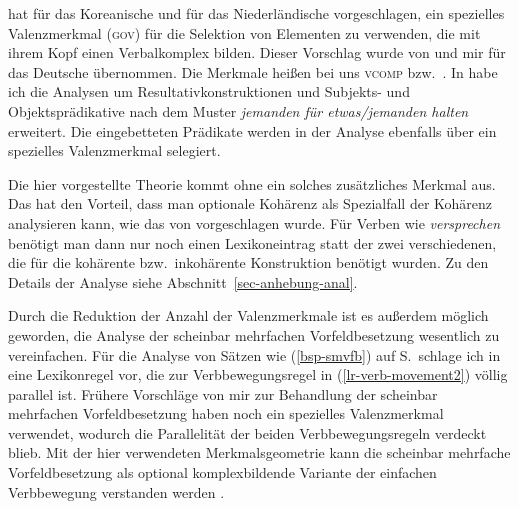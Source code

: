 \citet*{Chung93a} hat für das Koreanische
und \citet*{Rentier94} für das Niederländische vorgeschlagen,
ein spezielles Valenzmerkmal (\textsc{gov}) für die Selektion von Elementen zu verwenden,
die mit ihrem Kopf einen Verbalkomplex bilden. Dieser Vorschlag wurde
von \citet{Kathol98b,Kathol2000a} und mir \citep{Mueller97c,Mueller99a} für das Deutsche übernommen.
Die Merkmale heißen bei uns \textsc{vcomp} bzw.\ \xcomp.
In  habe ich die Analysen um Resultativkonstruktionen und Subjekts- und
Objektsprädikative nach dem Muster \emph{jemanden für etwas/jemanden halten} erweitert.
Die eingebetteten Prädikate werden in der Analyse ebenfalls über ein spezielles Valenzmerkmal selegiert.

Die hier vorgestellte Theorie kommt ohne ein solches zusätzliches Merkmal aus.
Das hat den Vorteil, dass man optionale Kohärenz als Spezialfall der Kohärenz analysieren
kann, wie das von \citet[178]{Kiss95a} vorgeschlagen wurde. Für Verben wie \emph{versprechen}
benötigt man dann nur noch einen Lexikoneintrag statt der zwei verschiedenen, die für
die kohärente bzw.\ inkohärente Konstruktion benötigt wurden. Zu den Details der Analyse siehe
Abschnitt~\ref{sec-anhebung-anal}.

Durch die Reduktion der Anzahl der Valenzmerkmale ist es außerdem möglich geworden,
die Analyse der scheinbar mehrfachen Vorfeldbesetzung wesentlich zu vereinfachen.
Für die Analyse von Sätzen wie (\ref{bsp-smvfb}) auf S.\,\pageref{bsp-smvfb} schlage ich in
\textcites{Mueller2005d}[Abschnitt~3.2.1]{MuellerGS}
eine Lexikonregel vor, die zur Verbbewegungsregel in (\ref{lr-verb-movement2})
völlig parallel ist. Frühere Vorschläge von mir zur Behandlung der 
scheinbar mehrfachen Vorfeldbesetzung \citep{Mueller2002f,Mueller2002c} haben
noch ein spezielles Valenzmerkmal verwendet, wodurch die Parallelität der beiden
Verbbewegungsregeln verdeckt blieb. Mit der hier verwendeten Merkmalsgeometrie kann
die scheinbar mehrfache Vorfeldbesetzung als optional komplexbildende Variante
der einfachen Verbbewegung verstanden werden \citep[321]{Mueller2005d}.



